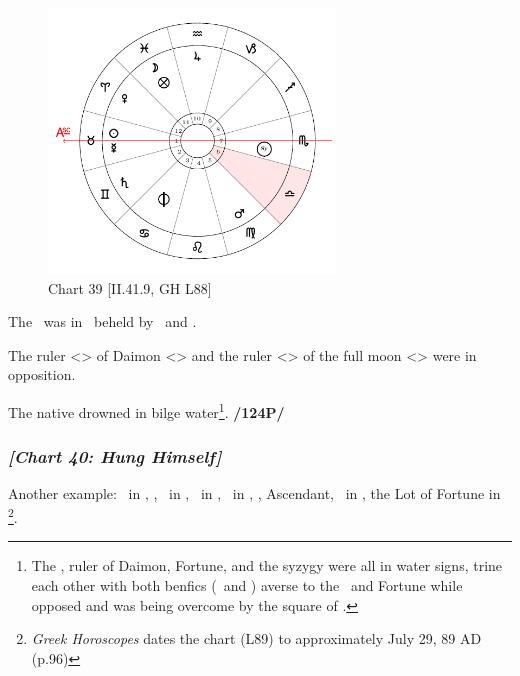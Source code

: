 \clearpage
\begin{figure}
\centering
\includegraphics[width=0.68\textwidth]{charts/2_41_9}
\caption{Chart 39 [II.41.9, GH L88]}
\label{fig:chart39}
\end{figure} 

The \Moon\, was in \Pisces\, beheld by \Saturn\, and \Mars. 

The ruler <\Moon> of Daimon <\Cancer> and the ruler <\Mars> of the full moon <\Scorpio> were in opposition. 

The native drowned in bilge water\footnote{The \Moon, ruler of Daimon, Fortune, and the syzygy were all in water signs, trine each other with both benfics (\Venus\, and \Jupiter) averse to the \Moon\, and Fortune while \Mars\, opposed and was being overcome by the square of \Saturn.}. \textbf{/124P/} 
\newpage
\subsubsection{\textit{[Chart 40: Hung Himself]}}
Another example: \Sun\, in \Leo, \Moon, \Mercury\, in \Virgo, \Saturn\, in \Gemini, \Jupiter\, in \Aries, \Mars, Ascendant, \Venus\, in \Cancer, the Lot of Fortune in \Gemini
\footnote{\textit{Greek Horoscopes} dates the chart (L89) to approximately July 29, 89 AD (p.96)}. 

